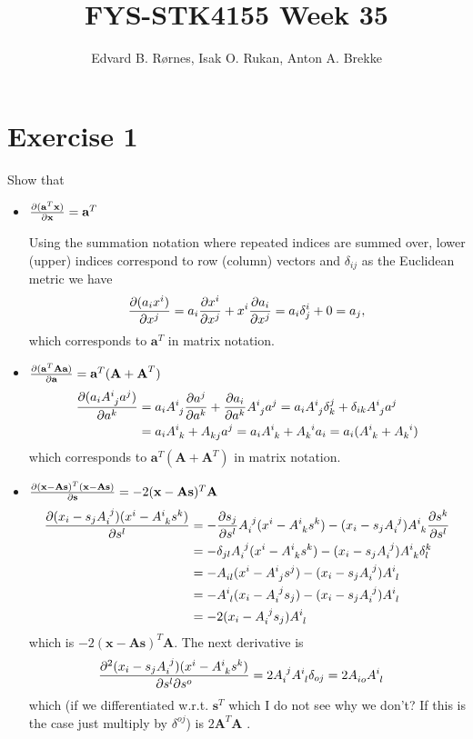 \documentclass{article}
\title{FYS-STK4155 Week 35}
\author{Edvard B. Rørnes, Isak O. Rukan, Anton A. Brekke}
\newcommand{\p}{\partial}
\begin{document}
	\maketitle
\section*{Exercise 1}
Show that
\begin{itemize}
	\item $\pdv{(\mathbf{a}^T\textbf{x})}{\textbf{x}}=\textbf{a}^T$
	
	Using the summation notation where repeated indices are summed over, lower (upper) indices correspond to row (column) vectors and $\delta_{ij}$ as the Euclidean metric we have
	\begin{align*}
		\pdv{(a_ix^i)}{x^j}=a_i\pdv{x^i}{x^j}+x^i\pdv{a_i}{x^j}=a_i\delta^i_j+0=a_j,
	\end{align*}
	which corresponds to $\textbf{a}^T$ in matrix notation. 
	
	\item $\pdv{(\mathbf{a}^T\textbf{A}\textbf{a})}{\textbf{a}}=\textbf{a}^T(\textbf{A}+\textbf{A}^T)$
	\begin{align*}
		\pdv{(a_i\tensor{A}{^i_j}a^j)}{a^k}&=a_i\tensor{A}{^i_j}\pdv{a^j}{a^k}+\pdv{a_i}{a^k}\tensor{A}{^i_j}a^j=a_i\tensor{A}{^i_j}\delta^j_k+\delta_{ik}\tensor{A}{^i_j}a^j\\
		&=a_i\tensor{A}{^i_k}+\tensor{A}{_k_j}a^j=a_i\tensor{A}{^i_k}+\tensor{A}{_k^i}a_i=a_i(\tensor{A}{^i_k}+\tensor{A}{_k^i})
	\end{align*}
	which corresponds to $\textbf{a}^T(\textbf{A}+\textbf{A}^T)$ in matrix notation.
	
	\item $\pdv{(\textbf{x}-\textbf{As})^T(\textbf{x}-\textbf{As})}{\textbf{s}}=-2(\textbf{x}-\textbf{As})^T\textbf{A}$
	\begin{align*}
		\pdv{(x_i-s_j\tensor{A}{_i^j})(x^i-\tensor{A}{^i_k}s^k)}{s^l}&=-\pdv{s_j}{s^l}\tensor{A}{_i^j}(x^i-\tensor{A}{^i_k}s^k)-(x_i-s_j\tensor{A}{_i^j})\tensor{A}{^i_k}\pdv{s^k}{s^l}\\
		&=-\delta_{jl}\tensor{A}{_i^j}(x^i-\tensor{A}{^i_k}s^k)-(x_i-s_j\tensor{A}{_i^j})\tensor{A}{^i_k}\delta^k_l\\
		&=-\tensor{A}{_i_l}(x^i-\tensor{A}{^i_j}s^j)-(x_i-s_j\tensor{A}{_i^j})\tensor{A}{^i_l}\\
		&=-\tensor{A}{^i_l}(x_i-\tensor{A}{_i^j}s_j)-(x_i-s_j\tensor{A}{_i^j})\tensor{A}{^i_l}\\
		&=-2(x_i-\tensor{A}{_i^j}s_j)\tensor{A}{^i_l}
	\end{align*}
	which is $-2(\textbf{x}-\textbf{As})^T\textbf{A}$. The next derivative is
	\begin{align*}
		 \frac{\p^2(x_i-s_j\tensor{A}{_i^j})(x^i-\tensor{A}{^i_k}s^k)}{\p s^l\p s^o}& = 2\tensor{A}{_i^j}\tensor{A}{^i_l}\delta_{oj}=2\tensor{A}{_i_o}\tensor{A}{^i_l}
	\end{align*}
	which (if we differentiated w.r.t. $\textbf{s}^T$ which I do not see why we don't? If this is the case just multiply by $\delta^{oj}$) is $2\textbf{A}^T\textbf{A}$ .
\end{itemize}
\end{document}
